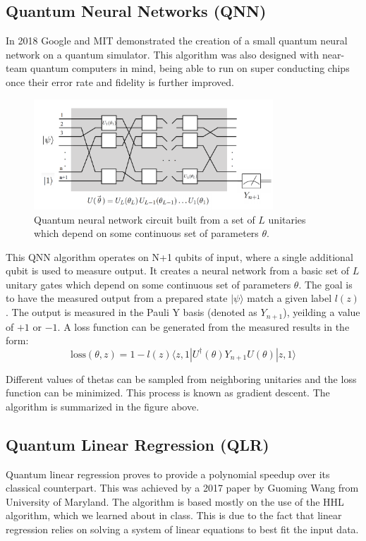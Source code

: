 \documentclass[12pt]{article}
\begin{document}
\subsection*{Quantum Neural Networks (QNN)}
In 2018 Google and MIT demonstrated the creation of a small quantum neural network on a quantum simulator. \cite{farhi2018classification} This algorithm was also designed with near-team quantum computers in mind, being able to run on super conducting chips once their error rate and fidelity is further improved.

\begin{figure}[h]
\centering
\includegraphics[width=0.8\textwidth]{QNN_Algo.png}
\caption{Quantum neural network circuit built from a set of $L$ unitaries which depend on some continuous set of parameters $\theta$.}
\end{figure}

This QNN algorithm operates on N+1 qubits of input, where a single additional qubit is used to measure output. It creates a neural network from a basic set of $L$ unitary gates which depend on some continuous set of parameters $\theta$. The goal is to have the measured output from a prepared state $|\psi\rangle$ match a given label $l(z)$. The output is measured in the Pauli Y basis (denoted as $Y_{n+1}$), yeilding a value of $+1$ or $-1$. A loss function can be generated from the measured results in the form:
\begin{equation}
    \text{loss} (\theta, z) = 1 - l(z) \langle z, 1| U^\dagger(\theta)Y_{n+1} U(\theta) |z, 1\rangle
\end{equation}

Different values of thetas can be sampled from neighboring unitaries and the loss function can be minimized. This process is known as gradient descent. The algorithm is summarized in the figure above.

\subsection*{Quantum Linear Regression (QLR)}
Quantum linear regression proves to provide a polynomial speedup over its classical counterpart. This was achieved by a 2017 paper by Guoming Wang from University of Maryland. \cite{Wang_2017} The algorithm is based mostly on the use of the HHL algorithm, which we learned about in class. This is due to the fact that linear regression relies on solving a system of linear equations to best fit the input data.
\end{document}
